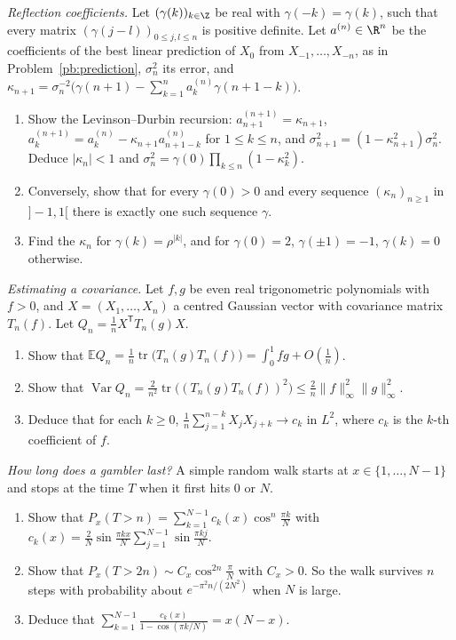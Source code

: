\begin{exercise}[$\star\star$]\label{pb:levinson}
\emph{Reflection coefficients.} Let $(\gamma(k))_{k\in\Z}$ be real with $\gamma(-k)=\gamma(k)$, such that every matrix $(\gamma(j-l))_{0\le j,l\le n}$ is positive definite. Let $a^{(n)}\in\R^n$ be the
coefficients of the best linear prediction of $X_0$ from $X_{-1},\dots,X_{-n}$, as in Problem~\ref{pb:prediction}, $\sigma_n^2$ its error, and
$\kappa_{n+1}=\sigma_n^{-2}\bigl(\gamma(n+1)-\sum_{k=1}^na_k^{(n)}\gamma(n+1-k)\bigr)$.
\begin{enumerate}[label=(\alph*)]
\item Show the Levinson--Durbin recursion: $a^{(n+1)}_{n+1}=\kappa_{n+1}$, $a^{(n+1)}_k=a^{(n)}_k-\kappa_{n+1}a^{(n)}_{n+1-k}$ for $1\le k\le n$, and $\sigma_{n+1}^2=(1-\kappa_{n+1}^2)\sigma_n^2$. Deduce
$|\kappa_n|<1$ and $\sigma_n^2=\gamma(0)\prod_{k\le n}(1-\kappa_k^2)$.
\item Conversely, show that for every $\gamma(0)>0$ and every sequence $(\kappa_n)_{n\ge1}$ in $]-1,1[$ there is exactly one such sequence $\gamma$.
\item Find the $\kappa_n$ for $\gamma(k)=\rho^{|k|}$, and for $\gamma(0)=2$, $\gamma(\pm1)=-1$, $\gamma(k)=0$ otherwise.
\end{enumerate}
\end{exercise}

\begin{exercise}[$\star\star$]\label{pb:quadratic}
\emph{Estimating a covariance.} Let $f,g$ be even real trigonometric polynomials with $f>0$, and $X=(X_1,\dots,X_n)$ a centred Gaussian vector with covariance matrix $T_n(f)$. Let
$Q_n=\frac1nX^{\mathsf T}T_n(g)X$.
\begin{enumerate}[label=(\alph*)]
\item Show that $\mathbb EQ_n=\frac1n\operatorname{tr}\bigl(T_n(g)T_n(f)\bigr)=\int_0^1fg+O(\frac1n)$.
\item Show that $\operatorname{Var}Q_n=\frac2{n^2}\operatorname{tr}\bigl((T_n(g)T_n(f))^2\bigr)\le\frac2n\|f\|_\infty^2\|g\|_\infty^2$.
\item Deduce that for each $k\ge0$, $\frac1n\sum_{j=1}^{n-k}X_jX_{j+k}\to c_k$ in $L^2$, where $c_k$ is the $k$-th coefficient of $f$.
\end{enumerate}
\end{exercise}

\begin{exercise}[$\star\star$]\label{pb:ruin}
\emph{How long does a gambler last?} A simple random walk starts at $x\in\{1,\dots,N-1\}$ and stops at the time $T$ when it first hits $0$ or $N$.
\begin{enumerate}[label=(\alph*)]
\item Show that $P_x(T>n)=\sum_{k=1}^{N-1}c_k(x)\cos^n\frac{\pi k}N$ with $c_k(x)=\frac2N\sin\frac{\pi kx}N\sum_{j=1}^{N-1}\sin\frac{\pi kj}N$.
\item Show that $P_x(T>2n)\sim C_x\cos^{2n}\frac\pi N$ with $C_x>0$. So the walk survives $n$ steps with probability about $e^{-\pi^2n/(2N^2)}$ when $N$ is large.
\item Deduce that $\sum_{k=1}^{N-1}\frac{c_k(x)}{1-\cos(\pi k/N)}=x(N-x)$.
\end{enumerate}
\end{exercise}

